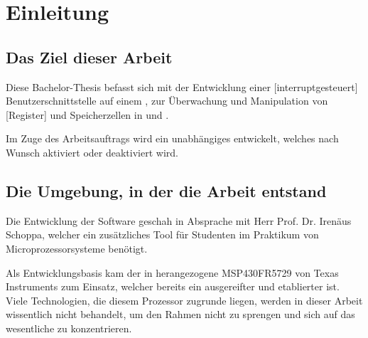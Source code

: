 
\chapter{Einleitung}
\label{cha:Einleitung}


\section{Das Ziel dieser Arbeit}
\label{sec:ZielDerArbeit}

Diese Bachelor-Thesis befasst sich mit der Entwicklung einer [interruptgesteuert] Benutzerschnittstelle auf einem , zur \"Uberwachung und Manipulation von [Register] und Speicherzellen in  und .

Im Zuge des Arbeitsauftrags wird ein unabh\"angiges  entwickelt, welches nach Wunsch aktiviert oder deaktiviert wird.


\section{Die Umgebung, in der die Arbeit entstand}
\label{sec:EntstehungsUmgebungArbeit}

Die Entwicklung der Software geschah in Absprache mit Herr Prof. Dr. Iren\"aus Schoppa, welcher ein zus\"atzliches Tool f\"ur Studenten im Praktikum von Microprozessorsysteme ben\"otigt.

Als Entwicklungsbasis kam der in  herangezogene MSP430FR5729 von Texas Instruments zum Einsatz, welcher bereits ein ausgereifter und etablierter  ist. Viele Technologien, die diesem Prozessor zugrunde liegen, werden in dieser Arbeit wissentlich nicht behandelt, um den Rahmen nicht zu sprengen und sich auf das wesentliche zu konzentrieren.


